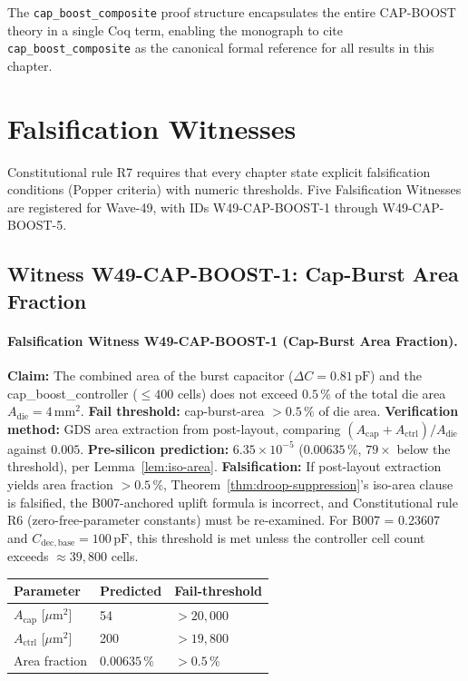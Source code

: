 \documentclass[12pt,a4paper]{report}
\theoremstyle{plain}
\theoremstyle{definition}
\theoremstyle{remark}
\newcommand{\Cbase}{C_{\mathrm{dec,base}}}
\newcommand{\deltaC}{\Delta C}
\begin{document}
The \texttt{cap\_boost\_composite} proof structure encapsulates the entire
CAP-BOOST theory in a single Coq term, enabling the monograph to cite
\texttt{cap\_boost\_composite} as the canonical formal reference for
all results in this chapter.

\section{Falsification Witnesses}
\label{sec:falsification}

Constitutional rule R7 requires that every chapter state explicit
falsification conditions (Popper criteria) with numeric thresholds.
Five Falsification Witnesses are registered for Wave-49, with IDs
W49-CAP-BOOST-1 through W49-CAP-BOOST-5.

\subsection{Witness W49-CAP-BOOST-1: Cap-Burst Area Fraction}

\paragraph{Falsification Witness W49-CAP-BOOST-1 (Cap-Burst Area Fraction).}
\label{fw:1}
\textbf{Claim:} The combined area of the burst capacitor ($\deltaC = 0.81\,\mathrm{pF}$)
and the cap\_boost\_controller ($\leq 400$ cells) does not exceed $0.5\,\%$
of the total die area $A_{\mathrm{die}} = 4\,\mathrm{mm}^{2}$.
\textbf{Fail threshold:} cap-burst-area $> 0.5\,\%$ of die area.
\textbf{Verification method:} GDS area extraction from post-layout,
comparing $(A_{\mathrm{cap}} + A_{\mathrm{ctrl}}) / A_{\mathrm{die}}$ against $0.005$.
\textbf{Pre-silicon prediction:} $6.35 \times 10^{-5}$ ($0.00635\,\%$,
$79\times$ below the threshold), per Lemma~\ref{lem:iso-area}.
\textbf{Falsification:} If post-layout extraction yields area fraction $> 0.5\,\%$,
Theorem~\ref{thm:droop-suppression}'s iso-area clause is falsified, the
B007-anchored uplift formula is incorrect, and Constitutional rule R6
(zero-free-parameter constants) must be re-examined.
For B007 = 0.23607 and $\Cbase = 100\,\mathrm{pF}$, this threshold is met
unless the controller cell count exceeds $\approx 39{,}800$ cells.

\begin{center}
\begin{tabular}{lll}
  \toprule
  Parameter & Predicted & Fail-threshold \\
  \midrule
  $A_{\mathrm{cap}}$ [$\mu\mathrm{m}^{2}$] & 54 & $> 20{,}000$ \\
  $A_{\mathrm{ctrl}}$ [$\mu\mathrm{m}^{2}$] & 200 & $> 19{,}800$ \\
  Area fraction & $0.00635\,\%$ & $> 0.5\,\%$ \\
  \bottomrule
\end{tabular}
\end{center}
\end{document}
